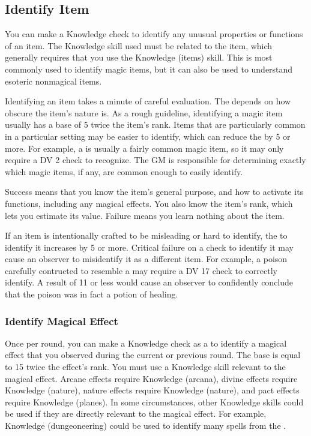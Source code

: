     \subsection{Identify Item}
        You can make a Knowledge check to identify any unusual properties or functions of an item.
        The Knowledge skill used must be related to the item, which generally requires that you use the Knowledge (items) skill.
        This is most commonly used to identify magic items, but it can also be used to understand esoteric nonmagical items.

        Identifying an item takes a minute of careful evaluation.
        The  depends on how obscure the item's nature is.
        As a rough guideline, identifying a magic item usually has a base  of 5 \add twice the item's rank.
        Items that are particularly common in a particular setting may be easier to identify, which can reduce the  by 5 or more.
        For example, a  is usually a fairly common magic item, so it may only require a DV 2 check to recognize.
        The GM is responsible for determining exactly which magic items, if any, are common enough to easily identify.

        Success means that you know the item's general purpose, and how to activate its functions, including any magical effects.
        You also know the item's rank, which lets you estimate its value.
        Failure means you learn nothing about the item.

        If an item is intentionally crafted to be misleading or hard to identify, the  to identify it increases by 5 or more.
        Critical failure on a check to identify it may cause an observer to misidentify it as a different item.
        For example, a poison carefully contructed to resemble a  may require a DV 17 check to correctly identify.
        A result of 11 or less would cause an observer to confidently conclude that the poison was in fact a potion of healing.

    \subsubsection{Identify Magical Effect}
        Once per round, you can make a Knowledge check as a  to identify a magical effect that you observed during the current or previous round.
        The base  is equal to 15 \add twice the effect's rank.
        You must use a Knowledge skill relevant to the magical effect.
        Arcane effects require Knowledge (arcana), divine effects require Knowledge (nature), nature effects require Knowledge (nature), and pact effects require Knowledge (planes).
        In some circumstances, other Knowledge skills could be used if they are directly relevant to the magical effect.
        For example, Knowledge (dungeoneering) could be used to identify many spells from the  .


